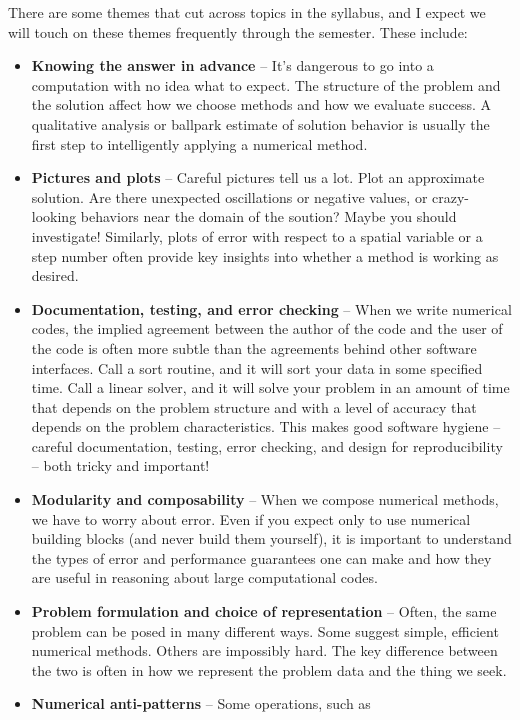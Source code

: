 \documentclass[12pt, leqno]{article}
\begin{document}
There are some themes that cut across topics in the syllabus,
and I expect we will touch on these themes frequently through
the semester.  These include:
\begin{itemize}
\item {\bf Knowing the answer in advance} -- It's dangerous to go into
  a computation with no idea what to expect.  The structure of the
  problem and the solution affect how we choose methods and how we
  evaluate success.  A qualitative analysis or ballpark estimate of
  solution behavior is usually the first step to intelligently
  applying a numerical method.
\item {\bf Pictures and plots} -- Careful pictures tell us a lot.
  Plot an approximate solution.  Are there unexpected oscillations or
  negative values, or crazy-looking behaviors near the domain of the
  soution?  Maybe you should investigate!  Similarly, plots of error
  with respect to a spatial variable or a step number often provide
  key insights into whether a method is working as desired.
\item {\bf Documentation, testing, and error checking} -- When we
  write numerical codes, the implied agreement between the author of
  the code and the user of the code is often more subtle than
  the agreements behind other software interfaces.  Call a sort
  routine, and it will sort your data in some specified time.  Call a
  linear solver, and it will solve your problem in an amount of time
  that depends on the problem structure and with a level of accuracy
  that depends on the problem characteristics.  This makes good
  software hygiene -- careful documentation, testing, error
  checking, and design for reproducibility -- both tricky and important!
\item {\bf Modularity and composability} -- When we compose numerical
  methods, we have to worry about error.  Even if you expect only
  to use numerical building blocks (and never build them yourself), it
  is important to understand the types of error and performance
  guarantees one can make and how they are useful in reasoning about
  large computational codes.
\item {\bf Problem formulation and choice of representation} -- Often, the
  same problem can be posed in many different ways.  Some suggest
  simple, efficient numerical methods.  Others are impossibly hard.
  The key difference between the two is often in how we represent the
  problem data and the thing we seek.
\item {\bf Numerical anti-patterns} -- Some operations, such as

\end{itemize}
\end{document}
